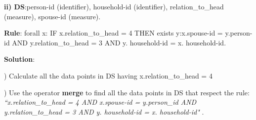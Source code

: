 \begin{table}
\footnotesize
{}
\caption{Translation of example ib)}
\centering
\label{Tab1-2}
\end{table}



\bigskip\noindent
\textbf{ii)  DS}:person-id (identifier), household-id (identifier), relation\_to\_head (measure), spouse-id (measure). 

\bigskip\noindent
\textbf{Rule}: forall x: IF x.relation\_to\_head = 4 THEN exists y:x.spouse-id = y.person-id AND y.relation\_to\_head = 3 AND y. household-id = x. household-id.

\bigskip\noindent
\textbf{Solution}:

) Calculate all the data points in DS having x.relation\_to\_head = 4
%


) Use the operator \textbf{merge} to find all the data points in DS that respect the rule: \textit{``x.relation\_to\_head = 4  AND x.spouse-id = y.person\_id AND y.relation\_to\_head = 3 AND y. household-id = x. household-id"} .

%
%
%
%
%
%
%
%


